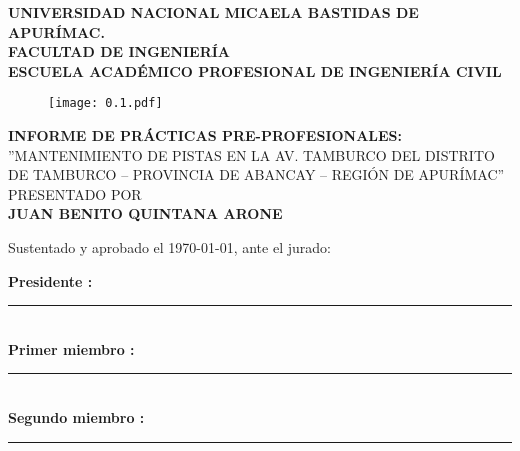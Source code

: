 
\begin{titlepage}
	\begin{center}
		\textsf{\textbf{\LARGE UNIVERSIDAD NACIONAL MICAELA BASTIDAS DE APURÍMAC.}}\\
		\vspace{4mm}
		\textsf{\textbf{\Large FACULTAD DE INGENIERÍA}}\\
		\vspace{4mm}
		\textsf{\textbf{ \large ESCUELA ACADÉMICO PROFESIONAL DE INGENIERÍA CIVIL}}\\
		\vspace{4mm}	
		\begin{figure}[h!]
			\centering
			\texttt{[image: 0.1.pdf]}
		\end{figure}
		
		\vspace{3mm}	
		\textsf{\textbf{ \Large INFORME DE PRÁCTICAS PRE-PROFESIONALES:}}\\
		\vspace{3mm}
		{\large\textsf{''MANTENIMIENTO DE PISTAS EN LA AV. TAMBURCO DEL DISTRITO DE TAMBURCO – PROVINCIA DE ABANCAY – REGIÓN DE APURÍMAC''}}\\
		\vspace{5mm}
		{\Large\textsf{PRESENTADO POR\\}}
		\textsf{\textbf{ \Large JUAN BENITO QUINTANA ARONE \\}}
		
		\vspace{5mm}	
		{\large \textsf{Sustentado y aprobado el \today, ante el jurado:}}\\
		\vspace{5mm}		

		\begin{flushleft}
			\textsf{\textbf{ \large Presidente	:}}\hspace{18mm} \rule{10cm}{0.4pt}\\
			\vspace{10mm}
			\textsf{\textbf{ \large Primer miembro	:}}\hspace{5mm} \rule{10cm}{0.4pt}\\
			\vspace{10mm}
			\textsf{\textbf{ \large Segundo miembro	:}} \rule{10cm}{0.4pt}\\
		\end{flushleft}
		
		\vfill
		
	\end{center}
\end{titlepage}

